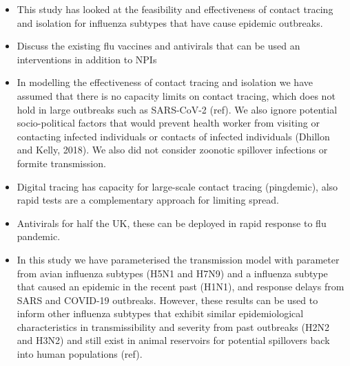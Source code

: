 \documentclass{article}
\begin{document}
\begin{itemize}
\item This study has looked at the feasibility and effectiveness of contact tracing and isolation for influenza subtypes that have cause epidemic outbreaks.
\item Discuss the existing flu vaccines and antivirals that can be used an interventions in addition to NPIs
\item In modelling the effectiveness of contact tracing and isolation we have assumed that there is no capacity limits on contact tracing, which does not hold in large outbreaks such as SARS-CoV-2 (ref). We also ignore potential socio-political factors that would prevent health worker from visiting or contacting infected individuals or contacts of infected individuals (Dhillon and Kelly, 2018). We also did not consider zoonotic spillover infections or formite transmission.
\item Digital tracing has capacity for large-scale contact tracing (pingdemic), also rapid tests are a complementary approach for limiting spread.
\item Antivirals for half the UK, these can be deployed in rapid response to flu pandemic.
\item In this study we have parameterised the transmission model with parameter from avian influenza subtypes (H5N1 and H7N9) and a influenza subtype that caused an epidemic in the recent past (H1N1), and response delays from SARS and COVID-19 outbreaks. However, these results can be used to inform other influenza subtypes that exhibit similar epidemiological characteristics in transmissibility and severity from past outbreaks (H2N2 and H3N2) and still exist in animal reservoirs for potential spillovers back into human populations (ref).
\end{itemize}



\end{document}
